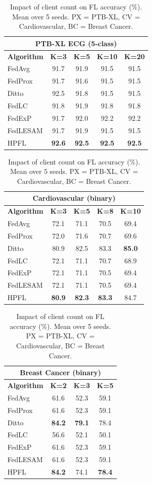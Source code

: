 \documentclass[conference]{IEEEtran}
\begin{document}
\begin{table}[t]
\centering
\caption{Impact of client count on FL accuracy (\%). Mean over 5 seeds. PX = PTB-XL, CV = Cardiovascular, BC = Breast Cancer.}
\label{tab:client_scaling}
\small
\begin{tabular}{lcccc}
\toprule
\multicolumn{5}{c}{\textbf{PTB-XL ECG (5-class)}} \\
\midrule
\textbf{Algorithm} & \textbf{K=3} & \textbf{K=5} & \textbf{K=10} & \textbf{K=20} \\
\midrule
FedAvg & 91.7 & 91.9 & 91.5 & 91.5 \\
FedProx & 91.7 & 91.6 & 91.5 & 91.5 \\
Ditto & 92.5 & 91.8 & 91.5 & 91.5 \\
FedLC & 91.8 & 91.9 & 91.8 & 91.8 \\
FedExP & 91.7 & 92.0 & 92.2 & 92.2 \\
FedLESAM & 91.7 & 91.9 & 91.5 & 91.5 \\
HPFL & \textbf{92.6} & \textbf{92.5} & \textbf{92.5} & \textbf{92.5} \\
\bottomrule
\end{tabular}
\hspace{3mm}
\begin{tabular}{lcccc}
\toprule
\multicolumn{5}{c}{\textbf{Cardiovascular (binary)}} \\
\midrule
\textbf{Algorithm} & \textbf{K=3} & \textbf{K=5} & \textbf{K=8} & \textbf{K=10} \\
\midrule
FedAvg & 72.1 & 71.1 & 70.5 & 69.4 \\
FedProx & 72.0 & 71.6 & 70.7 & 69.6 \\
Ditto & 80.9 & 82.5 & 83.3 & \textbf{85.0} \\
FedLC & 72.1 & 71.1 & 70.7 & 68.9 \\
FedExP & 72.1 & 71.1 & 70.5 & 69.4 \\
FedLESAM & 72.1 & 71.1 & 70.5 & 69.4 \\
HPFL & \textbf{80.9} & \textbf{82.3} & \textbf{83.3} & 84.7 \\
\bottomrule
\end{tabular}
\hspace{3mm}
\begin{tabular}{lccc}
\toprule
\multicolumn{4}{c}{\textbf{Breast Cancer (binary)}} \\
\midrule
\textbf{Algorithm} & \textbf{K=2} & \textbf{K=3} & \textbf{K=5} \\
\midrule
FedAvg & 61.6 & 52.3 & 59.1 \\
FedProx & 61.6 & 52.3 & 59.1 \\
Ditto & \textbf{84.2} & \textbf{79.1} & 78.4 \\
FedLC & 56.6 & 52.1 & 50.1 \\
FedExP & 61.6 & 52.3 & 59.1 \\
FedLESAM & 61.6 & 52.3 & 59.1 \\
HPFL & \textbf{84.2} & 74.1 & \textbf{78.4} \\
\bottomrule
\end{tabular}
\end{table}
\end{document}
